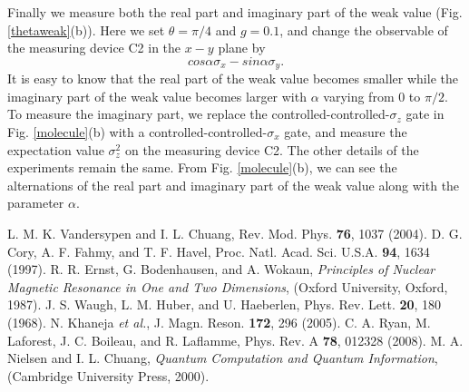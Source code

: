 \documentclass[prl,twocolumn,showpacs]{revtex4}
\begin{document}
Finally we measure both the real part and imaginary part of the weak value (Fig. \ref{thetaweak}(b)). Here we set $\theta = \pi/4$ and $g=0.1$, and change the observable of the measuring device C2 in the $x-y$ plane by
 \begin{equation}\label{imag}
cos\alpha \sigma_x - sin\alpha \sigma_y.
 \end{equation}
 It is easy to know that the real part of the weak value becomes smaller while the imaginary part of the weak value becomes larger with $\alpha$ varying from 0 to $\pi/2$. To measure the imaginary part, we replace the controlled-controlled-$\sigma_z$ gate in Fig. \ref{molecule}(b) with a controlled-controlled-$\sigma_x$ gate, and measure the expectation value $\sigma_z^2$ on the measuring device C2. The other details of the experiments remain the same. From Fig. \ref{molecule}(b), we can see the alternations of the real part and imaginary part of the weak value along with the parameter $\alpha$.





\begin{thebibliography}{28}

 L. M. K. Vandersypen and I. L. Chuang, Rev. Mod. Phys. \textbf{76}, 1037 (2004).
 D. G. Cory, A. F. Fahmy, and T. F. Havel, Proc. Natl. Acad. Sci. U.S.A. \textbf{94}, 1634 (1997).
 R. R. Ernst, G. Bodenhausen, and A. Wokaun, {\it Principles of Nuclear Magnetic Resonance in One and Two Dimensions}, (Oxford University, Oxford, 1987).
  J. S. Waugh, L. M. Huber, and U. Haeberlen, Phys. Rev. Lett. \textbf{20}, 180 (1968).
 N. Khaneja \emph{et al.}, J. Magn. Reson. \textbf{172}, 296 (2005).
 C. A. Ryan, M. Laforest, J. C. Boileau, and R. Laflamme, Phys. Rev. A \textbf{78}, 012328 (2008).
 M. A. Nielsen and I. L. Chuang, {\it Quantum Computation and Quantum Information}, (Cambridge University Press, 2000).
\end{thebibliography}
\end{document}
